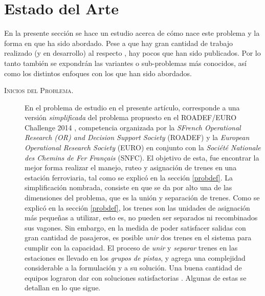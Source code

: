 \documentclass[letter, 10pt]{article}
\begin{document}
\section{Estado del Arte} \label{SoA}
En la presente sección se hace un estudio acerca de cómo nace este problema y la forma en que ha sido abordado. Pese a que  hay gran cantidad de trabajo realizado (y en desarrollo) al respecto \cite{RoadefResults}, hay pocos que han sido publicados. Por lo tanto también se expondrán las variantes o sub-problemas más conocidos, así como los distintos enfoques con los que han sido abordados.

\begin{description}
    \item[\textsc{Inicios del Problema.}] En el problema de estudio en el presente artículo, corresponde a una versión \textit{simplificada} del problema propuesto en el ROADEF/EURO Challenge 2014 \cite{Problem}, competencia organizada
    por la \textit{SFrench Operational Research (OR) and Decision Support Society} (ROADEF) y la \textit{European Operational Research Society} (EURO) en conjunto con la \textit{Société Nationale des Chemins de Fer Français} (SNFC).
    El objetivo de esta, fue encontrar la mejor forma realizar el manejo, ruteo y asignación de trenes en una estación ferroviaria, tal como se explicó en la sección \ref{probdef}. La simplificación nombrada, consiste en que se da por alto una de las dimensiones del problema, que es la unión y separación de trenes. Como se explicó en la sección \ref{probdef},
    los trenes son las unidades de asignación más pequeñas a utilizar, esto es, no pueden ser separados ni recombinados sus vagones. Sin embargo, en la medida de poder satisfacer salidas con gran cantidad de pasajeros, es posible \textit{unir}
    dos trenes en el sistema para cumplir con la capacidad. El proceso de \textit{unir} y \textit{separar} trenes en las estaciones es llevado en los \textit{grupos de pistas}, y agrega una complejidad considerable a la formulación y a su solución.
    Una buena cantidad de equipos lograron dar con soluciones satisfactorias \cite{RoadefResults}. Algunas de estas se detallan en lo que sigue.


\end{description}
\end{document}
